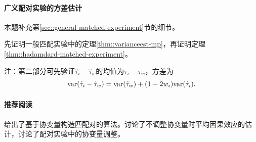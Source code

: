  
\paragraph{广义配对实验的方差估计} 
 \label{para::variance-general-matched}

本题补充第\ref{sec::general-matched-experiment}节的细节。 
 
 
先证明一般匹配实验中的定理\ref{thm::varianceest-mp}，再证明定理\ref{thm::hadamdard-matched-experiment}。 
 
注：第二部分可先验证$\hat\tau_i -\hat\tau_w$的均值为$\tau_i - \tau_w$，方差为
$$
 \textup{var}(\hat\tau_i -\hat\tau_w) = \textup{var}(\hat\tau_w ) + (1-2w_i) \textup{var}(\hat\tau_i). 
 $$


\paragraph{推荐阅读}

\citet{greevy2004optimal}给出了基于协变量构造匹配对的算法。\citet{imai2008variance}讨论了不调整协变量时平均因果效应的估计，\citet{fogarty2018regression}讨论了配对实验中的协变量调整。 


